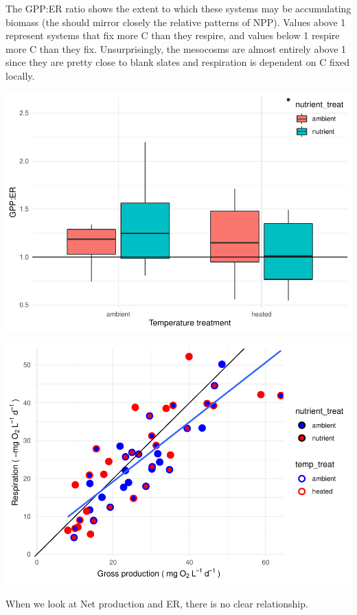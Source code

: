 \documentclass[
]{article}
\begin{document}
The GPP:ER ratio shows the extent to which these systems may be
accumulating biomass (the should mirror closely the relative patterns of
NPP). Values above 1 represent systems that fix more C than they
respire, and values below 1 respire more C than they fix.
Unsurprisingly, the mesocosms are almost entirely above 1 since they are
pretty close to blank slates and respiration is dependent on C fixed
locally.

\includegraphics{GPP-report_files/figure-latex/cont NEP estimates-1.pdf}

\includegraphics{GPP-report_files/figure-latex/contGPP-ER scatter-1.pdf}

When we look at Net production and ER, there is no clear relationship.
\end{document}
